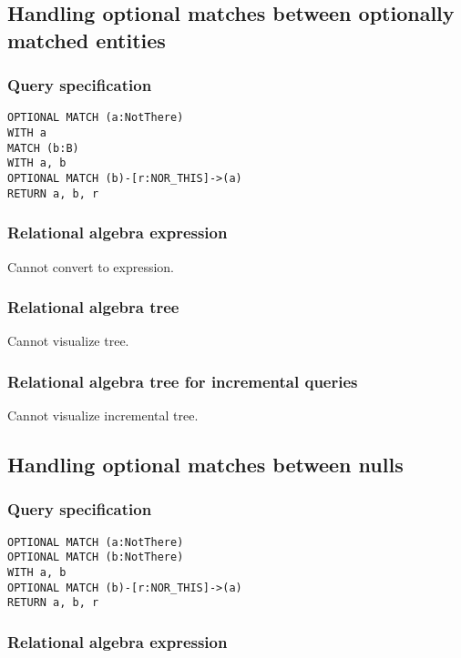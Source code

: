 \subsection{Handling optional matches between optionally matched entities}

\subsubsection*{Query specification}

\begin{lstlisting}
OPTIONAL MATCH (a:NotThere)
WITH a
MATCH (b:B)
WITH a, b
OPTIONAL MATCH (b)-[r:NOR_THIS]->(a)
RETURN a, b, r
\end{lstlisting}

\subsubsection*{Relational algebra expression}

Cannot convert to expression.

\subsubsection*{Relational algebra tree}

Cannot visualize tree.

\subsubsection*{Relational algebra tree for incremental queries}

Cannot visualize incremental tree.

\subsection{Handling optional matches between nulls}

\subsubsection*{Query specification}

\begin{lstlisting}
OPTIONAL MATCH (a:NotThere)
OPTIONAL MATCH (b:NotThere)
WITH a, b
OPTIONAL MATCH (b)-[r:NOR_THIS]->(a)
RETURN a, b, r
\end{lstlisting}

\subsubsection*{Relational algebra expression}

